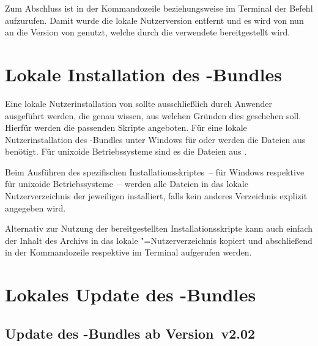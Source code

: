 Zum Abschluss ist in der Kommandozeile beziehungsweise im Terminal der Befehl 
 aufzurufen. Damit wurde die lokale Nutzerversion entfernt und es 
wird von nun an die Version von \TUDScript genutzt, welche durch die verwendete 
\Distro bereitgestellt wird.



\section{%
  Lokale Installation des \TUDScript-Bundles%
  \label{sec:local:install}%
}

Eine lokale Nutzerinstallation von \TUDScript sollte ausschließlich durch 
Anwender ausgeführt werden, die genau wissen, aus welchen Gründen dies 
geschehen soll. Hierfür werden die passenden Skripte angeboten. Für eine lokale 
Nutzerinstallation des \TUDScript-Bundles unter Windows für \TeXLive oder 
\MiKTeX werden die Dateien aus 
 benötigt. Für unixoide 
Betriebssysteme sind es die Dateien aus 
.

Beim Ausführen des spezifischen Installationsskriptes~-- 
 für Windows respektive 
 für unixoide Betriebssysteme~-- werden 
alle Dateien in das lokale Nutzerverzeichnis der jeweiligen \Distro 
installiert, falls kein anderes Verzeichnis explizit angegeben wird. 

Alternativ zur Nutzung der bereitgestellten Installationsskripte kann auch 
einfach der Inhalt des Archivs  in das 
lokale "=Nutzerverzeichnis kopiert und abschließend in der 
Kommandozeile respektive im Terminal  aufgerufen werden. 



\section{%
  Lokales Update des \TUDScript-Bundles%
  \label{sec:local:update}%
}
\subsection{Update des \TUDScript-Bundles ab Version~v2.02}

